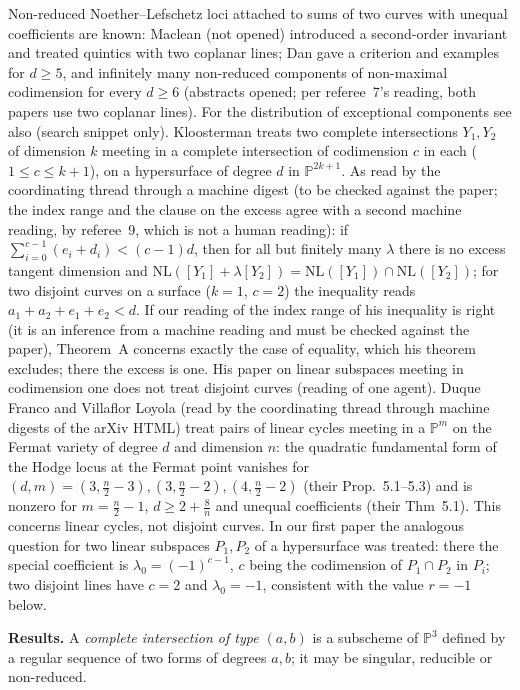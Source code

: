 \documentclass[11pt]{article}
\numberwithin{equation}{section}
\theoremstyle{remark}
\newcommand{\PP}{\mathbb{P}}
\newcommand{\NL}{\mathrm{NL}}
\newcommand{\run}[1]{\medskip\noindent\textbf{#1}}
\begin{document}
Non-reduced Noether--Lefschetz loci attached to sums of two curves with unequal coefficients are known: Maclean
\cite{Mac} (not opened) introduced a second-order invariant and treated quintics with two coplanar lines; Dan
\cite{Dan1} gave a criterion and examples for $d\ge5$, and \cite{Dan2} infinitely many non-reduced components of
non-maximal codimension for every $d\ge6$ (abstracts opened; per referee~7's reading, both papers use two
coplanar lines). For the distribution of exceptional components see also \cite{BKU} (search snippet only).
Kloosterman \cite[Thm~1.5, Thm~3.16]{Kl} treats two complete intersections $Y_1,Y_2$ of dimension $k$ meeting
in a complete intersection of codimension $c$ in each ($1\le c\le k+1$), on a hypersurface of degree $d$ in
$\PP^{2k+1}$. As read by the coordinating thread through a machine digest (to be checked against the paper; the index range
and the clause on the excess agree with a second machine reading, by referee~9, which is not a human reading): if
$\sum_{i=0}^{c-1}(e_i+d_i)<(c-1)d$, then for all but finitely many $\lambda$ there is no excess tangent dimension
and $\NL([Y_1]+\lambda[Y_2])=\NL([Y_1])\cap\NL([Y_2])$; for two disjoint curves on a surface ($k=1$, $c=2$) the
inequality reads $a_1+a_2+e_1+e_2<d$. If our reading of the index range of his inequality is right (it is an
inference from a machine reading and must be checked against the paper), Theorem~A concerns exactly the case of
equality, which his theorem excludes; there the excess is one. His paper \cite{Kl2} on linear subspaces meeting
in codimension one does not treat disjoint curves (reading of one agent). Duque Franco and Villaflor Loyola
\cite[\S5]{DFV} (read by the coordinating thread through machine digests of the arXiv HTML) treat pairs of
linear cycles meeting in a $\PP^m$ on the Fermat variety of degree $d$ and dimension $n$: the quadratic
fundamental form of the Hodge locus at the Fermat point vanishes for
$(d,m)=(3,\frac n2-3),(3,\frac n2-2),(4,\frac n2-2)$ (their Prop.~5.1--5.3) and is nonzero for $m=\frac n2-1$,
$d\ge2+\frac8n$ and unequal coefficients (their Thm~5.1). This concerns linear cycles, not disjoint curves.
In our first paper \cite{P1} the analogous question for two linear subspaces $P_1,P_2$ of a hypersurface was
treated: there the special coefficient is $\lambda_0=(-1)^{c-1}$, $c$ being the codimension of $P_1\cap P_2$ in
$P_i$; two disjoint lines have $c=2$ and $\lambda_0=-1$, consistent with the value $r=-1$ below.

\run{Results.}
A \emph{complete intersection of type $(a,b)$} is a subscheme of $\PP^3$ defined by a regular sequence of two
forms of degrees $a,b$; it may be singular, reducible or non-reduced.
\end{document}
